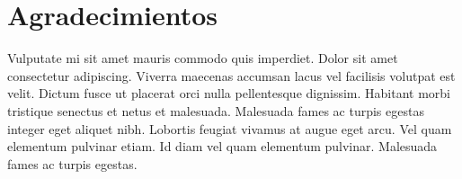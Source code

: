 
\newpage
\clearpage{\pagestyle{empty}\cleardoublepage}
\newpage

\chapter*{\centering \large Agradecimientos}

Vulputate mi sit amet mauris commodo quis imperdiet. Dolor sit amet consectetur adipiscing. Viverra maecenas accumsan lacus vel facilisis volutpat est velit. Dictum fusce ut placerat orci nulla pellentesque dignissim. Habitant morbi tristique senectus et netus et malesuada. Malesuada fames ac turpis egestas integer eget aliquet nibh. Lobortis feugiat vivamus at augue eget arcu. Vel quam elementum pulvinar etiam. Id diam vel quam elementum pulvinar. Malesuada fames ac turpis egestas.